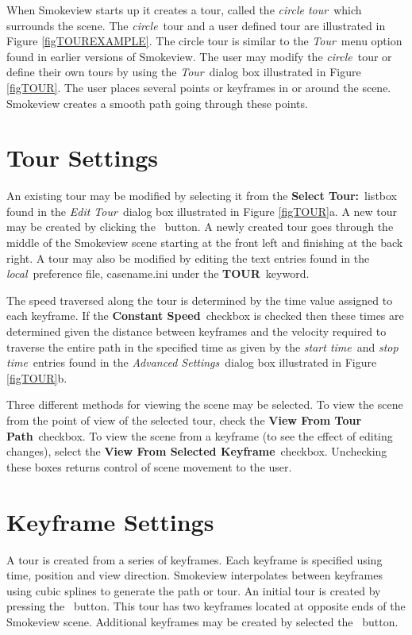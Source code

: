 \documentclass[11pt,twoside]{book}
\newcommand{\frameit}[1]{\fbox{\tt #1}}
\begin{document}
When Smokeview starts up it creates a tour, called the {\em circle
tour}\ which surrounds the scene.  The {\em circle}\ tour and a
user defined tour are illustrated in Figure \ref{figTOUREXAMPLE}.
The circle tour is similar to the {\em Tour}\ menu option found in
earlier versions of Smokeview. The user may modify the {\em
circle}\ tour or define their own tours by using the {\em Tour}\
dialog box illustrated in Figure \ref{figTOUR}. The user places
several points or keyframes in or around the scene. Smokeview
creates a smooth path going through these points.

\section{Tour Settings}
An existing tour may be modified by selecting it from the {\bf
Select Tour:}\ listbox found in the {\em Edit Tour}\ dialog box
illustrated in Figure \ref{figTOUR}a.  A new tour may be created
by clicking the \frameit{New Tour}\ button. A newly created tour
goes through the middle of the Smokeview scene starting at the
front left and finishing at the back right. A tour may also be
modified by editing the text entries found in the {\em local}\
preference file, casename.ini under the {\bf TOUR}\ keyword.

The speed traversed along the tour is determined by the time value
assigned to each keyframe.   If the {\bf Constant Speed}\ checkbox
is checked then these times are determined given the distance
between keyframes and the velocity required to traverse the entire
path in the specified time as given by the {\em start time}\ and
{\em stop time}\ entries found in the {\em Advanced Settings}\ dialog
box illustrated in Figure \ref{figTOUR}b.


Three different methods for viewing the scene may be selected.  To
view the scene from the point of view of the selected tour, check
the {\bf View From Tour Path}\ checkbox. To view the scene from a
keyframe (to see the effect of editing changes), select the {\bf
View From Selected Keyframe}\ checkbox. Unchecking these boxes
returns control of scene movement to the user.

\section{Keyframe Settings}
A tour is created from a series of keyframes.  Each keyframe is
specified using time, position and view direction.  Smokeview
interpolates between keyframes using cubic splines to generate the
path or tour.  An initial tour is created by pressing the
\frameit{Add Tour}\ button.  This tour has two keyframes located
at opposite ends of the Smokeview scene.  Additional keyframes may
be created by selected the \frameit{Add}\ button.
\end{document}
